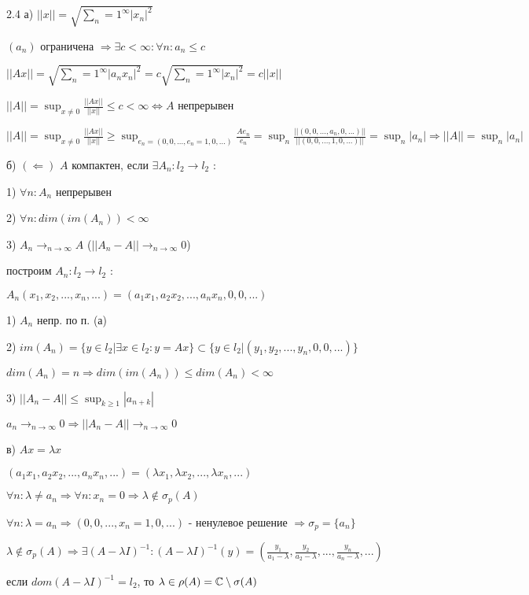 \documentclass[russian]{article}
\begin{document}
2.4 а) $||x||=\sqrt{\sum_n=1^\infty|x_n|^2}$

$(a_n)$ ограничена $ \Rightarrow \exists c < \infty : \forall n : a_n \le c $ 

$||Ax||=\sqrt{\sum_n=1^\infty|a_n x_n|^2}=c\sqrt{\sum_n=1^\infty|x_n|^2}=c||x||$

$||A||=\sup_{x \ne 0} \frac{||Ax||}{||x||} \le c < \infty \Leftrightarrow A $ непрерывен

$||A||=\sup_{x \ne 0} \frac{||Ax||}{||x||} \ge \sup_{e_n=(0, 0, ..., e_n = 1, 0, ...)} \frac{Ae_n}{e_n}=\sup_n \frac{||(0, 0, ..., a_n, 0, ...)||}{||(0, 0, ..., 1, 0, ...)||}=\sup_n |a_n| \Rightarrow ||A||=\sup_n |a_n|$

б) $(\Leftarrow) $ $A$ компактен, если $\exists A_n : l_2 \rightarrow l_2$ : 

1) $\forall n : A_n$ непрерывен

2) $\forall n : dim(im(A_n)) < \infty$

3) $A_n \rightarrow_{n \rightarrow \infty} A$ ($||A_n - A||\rightarrow_{n \rightarrow \infty} 0$)

построим $A_n:l_2\rightarrow l_2$ : 

$A_n (x_1, x_2, ..., x_n, ...)=(a_1 x_1, a_2 x_2, ..., a_n x_n, 0, 0, ...)$

1) $A_n$ непр. по п. (а)

2) $im(A_n)=\{y\in l_2 | \exists x \in l_2 : y = Ax\} \subset \{y \in l_2 | (y_1, y_2, ..., y_n, 0, 0, ...)\}$

$dim(A_n) = n \Rightarrow dim(im(A_n)) \le dim(A_n) < \infty$

3) $||A_n - A|| \le \sup _{k \ge 1} |a_{n+k}|$

$a_n \rightarrow_{n\rightarrow \infty} 0 \Rightarrow ||A_n - A|| \rightarrow_{n \rightarrow \infty} 0$

в) $Ax = \lambda x$

$(a_1 x_1, a_2 x_2, ..., a_n x_n, ...) = (\lambda x_1, \lambda x_2, ..., \lambda x_n, ...)$

$\forall n:\lambda \ne a_n \Rightarrow \forall n : x_n = 0 \Rightarrow \lambda \notin \sigma_p(A)$

$\forall n:\lambda = a_n \Rightarrow (0, 0, ..., x_n = 1, 0, ...)$ - ненулевое решение $\Rightarrow \sigma_p = \{a_n\}$

$\lambda \notin \sigma_p(A) \Rightarrow \exists (A-\lambda I)^{-1} : (A-\lambda I)^{-1}(y) = (\frac{y_1}{a_1-\lambda}, \frac{y_2}{a_2-\lambda}, ..., \frac{y_n}{a_n-\lambda}, ...)$

если $dom(A-\lambda I)^{-1}=l_2$, то $\lambda \in \rho(A) = \Bbb{C} \setminus \sigma(A)$
\end{document}
